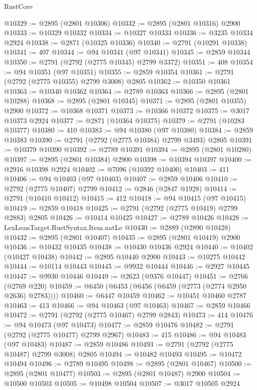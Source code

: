\begin{lexlean}{RustCore}
\begin{coremodule}
@10329 := @2895 (@2801 @10306)
@10332 := @2895 (@2801 @10316) @2900
@10333 := @10329 @10332
@10334 := @10327 @10333
@10336 := @3235 @10334 @2924
@10338 := @2871 (@10325 @10336)
@10340 := @2791 (@10291 @10338)
@10341 := 407
@10344 := @94 @10341 (@97 @10341)
@10345 := @2859 @10344
@10350 := @2791 (@2792 (@2775 @10345) @2799 @3372)
@10351 := 408
@10354 := @94 @10351 (@97 @10351)
@10355 := @2859 @10354
@10361 := @2791 (@2792 (@2775 @10355) @2799 @3008) @2805
@10362 := @10350 @10361
@10363 := @10340 @10362
@10364 := @2789 @10363
@10366 := @2895 (@2801 @10288)
@10368 := @2895 (@2801 @10345)
@10371 := @2895 (@2801 @10355) @2900
@10372 := @10368 @10371
@10373 := @10366 @10372
@10375 := @3017 @10373 @2924
@10377 := @2871 (@10364 @10375)
@10379 := @2791 (@10283 @10377)
@10380 := 410
@10383 := @94 @10380 (@97 @10380)
@10384 := @2859 @10383
@10390 := @2791 (@2792 (@2775 @10384) @2799 @3493) @2805
@10391 := @10379 @10390
@10392 := @2789 @10391
@10394 := @2895 (@2801 @10280)
@10397 := @2895 (@2801 @10384) @2900
@10398 := @10394 @10397
@10400 := @2916 @10398 @2924
@10402 := @7096 (@10392 @10400)
@10403 := 411
@10406 := @94 @10403 (@97 @10403)
@10407 := @2859 @10406
@10410 := @2792 (@2775 @10407) @2799
@10412 := @2846 (@2847 @1928)
@10414 := @2791 (@10410 @10412)
@10415 := 412
@10418 := @94 @10415 (@97 @10415)
@10419 := @2859 @10418
@10425 := @2791 (@2792 (@2775 @10419) @2799 @2883) @2805
@10426 := @10414 @10425
@10427 := @2789 @10426
@10428 := LexLeanTarget.RustSyntax.Item.natLe
@10430 := @2889 (@2890 @10428)
@10432 := @2895 (@2801 @10407)
@10435 := @2895 (@2801 @10419) @2900
@10436 := @10432 @10435
@10438 := @10430 @10436 @2924
@10440 := @10402 (@10427 @10438)
@10442 := @2895 @10440 @2900
@10443 := @10275 @10442
@10444 := @10114 @10443
@10445 := @9932 @10444
@10446 := @2927 @10445
@10447 := @9930 @10446
@10449 := @2623 (@9376 @10447)
@10451 := @2766 (@2769 @220)
@10459 := @6450 (@6453 (@6456 (@6459 (@2773 (@2774 @2950 @2636) @2783))))
@10460 := @6447 @10459
@10462 := @10451 @10460 @2787
@10463 := 413
@10466 := @94 @10463 (@97 @10463)
@10467 := @2859 @10466
@10472 := @2791 (@2792 (@2775 @10467) @2799 @2843)
@10473 := 414
@10476 := @94 @10473 (@97 @10473)
@10477 := @2859 @10476
@10482 := @2791 (@2792 (@2775 @10477) @2799 @2967)
@10483 := 415
@10486 := @94 @10483 (@97 @10483)
@10487 := @2859 @10486
@10493 := @2791 (@2792 (@2775 @10487) @2799 @3008) @2805
@10494 := @10482 @10493
@10495 := @10472 @10494
@10496 := @2789 @10495
@10498 := @2895 (@2801 @10467)
@10500 := @2895 (@2801 @10477)
@10503 := @2895 (@2801 @10487) @2900
@10504 := @10500 @10503
@10505 := @10498 @10504
@10507 := @3017 @10505 @2924

\end{coremodule}
\end{lexlean}
